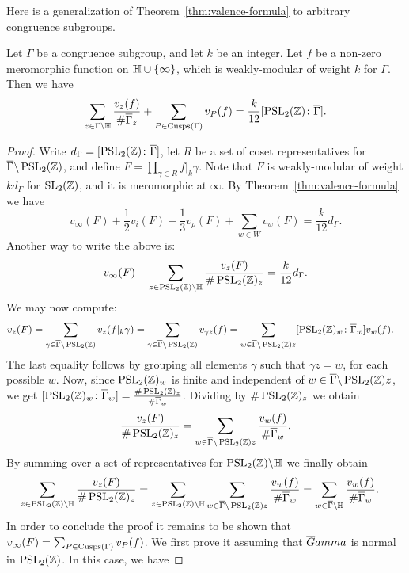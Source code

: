 Here is a generalization of Theorem~\ref{thm:valence-formula} to arbitrary congruence subgroups.
\begin{theorem}
  Let $\Gamma$ be a congruence subgroup, and let $k$ be an integer. Let $f$ be a non-zero meromorphic function on $\mathbb{H}\cup\{\infty\}$, which is weakly-modular of weight $k$ for $\Gamma$. Then we have
\[
\sum_{z\in\Gamma\backslash\mathbb{H}} \frac{v_z(f)}{\#\overline{\Gamma}_z} +\sum_{P\in\operatorname{Cusps}(\Gamma)} v_P(f)=\frac{k}{12}[\operatorname{PSL}_2(\mathbb{Z})\colon\overline{\Gamma}].
\]
\end{theorem}
\begin{proof}
  Write $d_\Gamma=[\operatorname{PSL}_2(\mathbb{Z})\colon\overline{\Gamma}]$, let $R$ be a set of coset representatives for $\overline{\Gamma}\backslash\operatorname{PSL}_2(\mathbb{Z})$, and define $F=\prod_{\gamma\in R} f|_k\gamma$. Note that $F$ is weakly-modular of weight $kd_\Gamma$ for $\operatorname{SL}_2(\mathbb{Z})$, and it is meromorphic at $\infty$. By Theorem~\ref{thm:valence-formula} we have
\[
v_\infty(F)+\frac 12 v_i(F) + \frac 13 v_\rho(F) +\sum_{w\in W} v_w(F) = \frac{k}{12} d_\Gamma.
\]
Another way to write the above is:
\[
 v_\infty(F) + \sum_{z\in\operatorname{PSL}_2(\mathbb{Z})\backslash\mathbb{H}} \frac{v_z(F)}{\#\operatorname{PSL}_2(\mathbb{Z})_z} = \frac{k}{12} d_\Gamma.
\]
We may now compute:
\begin{align*}
v_z(F) &= \sum_{\gamma\in\overline{\Gamma}\backslash\operatorname{PSL}_2(\mathbb{Z})} v_z(f|_k\gamma) = \sum_{\gamma\in\overline{\Gamma}\backslash\operatorname{PSL}_2(\mathbb{Z})} v_{\gamma z}(f)=\sum_{w\in\overline{\Gamma}\backslash \operatorname{PSL}_2(\mathbb{Z})z} [\operatorname{PSL}_2(\mathbb{Z})_w\colon\overline{\Gamma}_w] v_w(f).
\end{align*}
The last equality follows by grouping all elements $\gamma$ such that $\gamma z=w$, for each possible $w$. Now, since $\operatorname{PSL}_2(\mathbb{Z})_w$ is finite and independent of $w\in \overline{\Gamma}\backslash\operatorname{PSL}_2(\mathbb{Z})z$, we get
$[\operatorname{PSL}_2(\mathbb{Z})_w\colon\overline{\Gamma}_w]=\frac{\# \operatorname{PSL}_2(\mathbb{Z})_z}{\#\overline{\Gamma}_w}$.
Dividing by $\#\operatorname{PSL}_2(\mathbb{Z})_z$ we obtain
\[
\frac{v_z(F)}{\#\operatorname{PSL}_2(\mathbb{Z})_z} = \sum_{w\in \overline{\Gamma}\backslash \operatorname{PSL}_2(\mathbb{Z})z} \frac{v_w(f)}{\#\overline{\Gamma}_w}.
\]
By summing over a set of representatives for $\operatorname{PSL}_2(\mathbb{Z})\backslash \mathbb{H}$ we finally obtain
\begin{align*}
\sum_{z\in\operatorname{PSL}_2(\mathbb{Z})\backslash\mathbb{H}} \frac{v_z(F)}{\#\operatorname{PSL}_2(\mathbb{Z})_z} &=\sum_{z\in\operatorname{PSL}_2(\mathbb{Z})\backslash \mathbb{H}}\sum_{w\in\overline{\Gamma}\backslash \operatorname{PSL}_2(\mathbb{Z})z} \frac{v_w(f)}{\#\overline{\Gamma}_w}=\sum_{w\in\overline{\Gamma}\backslash\mathbb{H}} \frac{v_w(f)}{\#\overline{\Gamma}_w}.
\end{align*}
In order to conclude the proof it remains to be shown that $v_\infty(F) = \sum_{P\in\operatorname{Cusps}(\Gamma)} v_P(f)$. We first prove it assuming that $\overline{G}amma$ is normal in $\operatorname{PSL}_2(\mathbb{Z})$. In this case, we have

\end{proof}
